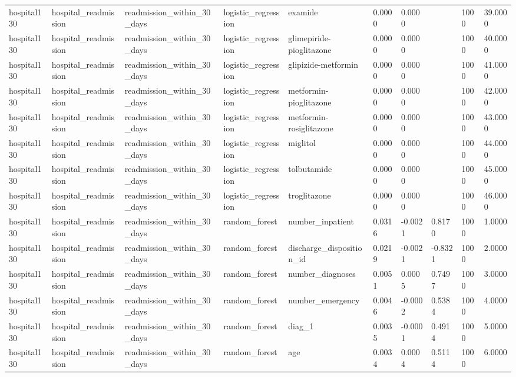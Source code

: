 \begin{tabular}{llllllllll}
hospital130 & hospital\_readmission & readmission\_within\_30\_days & logistic\_regression & examide & 0.0000 & 0.0000 &  & 1000 & 39.0000 \\
hospital130 & hospital\_readmission & readmission\_within\_30\_days & logistic\_regression & glimepiride-pioglitazone & 0.0000 & 0.0000 &  & 1000 & 40.0000 \\
hospital130 & hospital\_readmission & readmission\_within\_30\_days & logistic\_regression & glipizide-metformin & 0.0000 & 0.0000 &  & 1000 & 41.0000 \\
hospital130 & hospital\_readmission & readmission\_within\_30\_days & logistic\_regression & metformin-pioglitazone & 0.0000 & 0.0000 &  & 1000 & 42.0000 \\
hospital130 & hospital\_readmission & readmission\_within\_30\_days & logistic\_regression & metformin-rosiglitazone & 0.0000 & 0.0000 &  & 1000 & 43.0000 \\
hospital130 & hospital\_readmission & readmission\_within\_30\_days & logistic\_regression & miglitol & 0.0000 & 0.0000 &  & 1000 & 44.0000 \\
hospital130 & hospital\_readmission & readmission\_within\_30\_days & logistic\_regression & tolbutamide & 0.0000 & 0.0000 &  & 1000 & 45.0000 \\
hospital130 & hospital\_readmission & readmission\_within\_30\_days & logistic\_regression & troglitazone & 0.0000 & 0.0000 &  & 1000 & 46.0000 \\
hospital130 & hospital\_readmission & readmission\_within\_30\_days & random\_forest & number\_inpatient & 0.0316 & -0.0021 & 0.8170 & 1000 & 1.0000 \\
hospital130 & hospital\_readmission & readmission\_within\_30\_days & random\_forest & discharge\_disposition\_id & 0.0219 & -0.0021 & -0.8321 & 1000 & 2.0000 \\
hospital130 & hospital\_readmission & readmission\_within\_30\_days & random\_forest & number\_diagnoses & 0.0051 & 0.0005 & 0.7497 & 1000 & 3.0000 \\
hospital130 & hospital\_readmission & readmission\_within\_30\_days & random\_forest & number\_emergency & 0.0046 & -0.0002 & 0.5384 & 1000 & 4.0000 \\
hospital130 & hospital\_readmission & readmission\_within\_30\_days & random\_forest & diag\_1 & 0.0035 & -0.0001 & 0.4914 & 1000 & 5.0000 \\
hospital130 & hospital\_readmission & readmission\_within\_30\_days & random\_forest & age & 0.0034 & 0.0004 & 0.5114 & 1000 & 6.0000 \\

\end{tabular}
